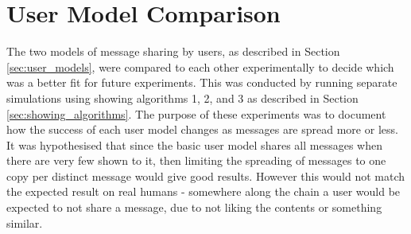 \documentclass[bsc,frontabs,twoside,singlespacing,parskip,deptreport]{infthesis}     %
\begin{document}
\section{User Model Comparison}
The two models of message sharing by users, as described in Section \ref{sec:user_models}, were compared to each other experimentally to decide which was a better fit for future experiments. This was conducted by running separate simulations using showing algorithms 1, 2, and 3 as described in Section \ref{sec:showing_algorithms}. The purpose of these experiments was to document how the success of each user model changes as messages are spread more or less. It was hypothesised that since the basic user model shares all messages when there are very few shown to it, then limiting the spreading of messages to one copy per distinct message would give good results. However this would not match the expected result on real humans - somewhere along the chain a user would be expected to not share a message, due to not liking the contents or something similar.
\end{document}
